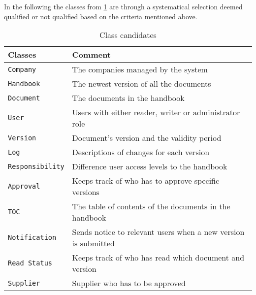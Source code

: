 In the following the classes from \cref{tab:ClassCandidates} are through a systematical selection deemed qualified or not qualified based on the criteria mentioned above.


\begin{table} [H]
\begin{tabular}{l l}
	\hline
	Classes & Comment\\
	\hline
	\texttt{Company} & The companies managed by the system \\
	\texttt{Handbook} & The newest version of all the documents\\
	\texttt{Document} & The documents in the handbook\\
	\texttt{User }& Users with either reader, writer or administrator role\\
	\texttt{Version} & Document’s version and the validity period\\
	\texttt{Log} & Descriptions of changes for each version\\ 
	\texttt{Responsibility} & Difference user access levels to the handbook\\ 
	\texttt{Approval} & Keeps track of who has to approve specific 
	versions\\ 
	\texttt{TOC} & The table of contents of the documents in the handbook\\
	\texttt{Notification} & Sends notice to relevant users when a new version is submitted\\ 
	\texttt{Read Status} & Keeps track of who has read which document and version\\
	\texttt{Supplier} & Supplier who has to be approved \\
	\hline
\end{tabular}
\caption{Class candidates}\label{tab:ClassCandidates}
\end{table} 

